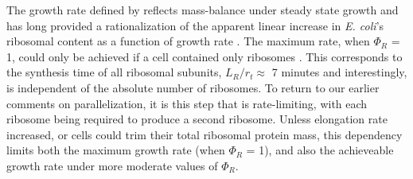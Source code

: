 The growth rate defined by  reflects
mass-balance under steady state growth and has long provided a rationalization
of the apparent linear increase in \textit{E. coli}'s ribosomal content as a
function of growth rate \citep{goldberger1979, scott2010}. The maximum rate,
when $\Phi_R$ = 1, could only be achieved if a cell contained only ribosomes \citep{dill2011}.
This corresponds to the synthesis time of all ribosomal subunits, $L_R/ r_t
\approx$ 7 minutes and interestingly, is independent of the
absolute number of ribosomes. To return to our earlier comments on
parallelization, it is this step that is rate-limiting, with each ribosome being
required to produce a second ribosome. Unless elongation rate increased, or
cells could trim their total ribosomal protein mass, this dependency limits both
the maximum growth rate (when $\Phi_R$ = 1), and also the achieveable growth
rate under more moderate values of $\Phi_R$.


